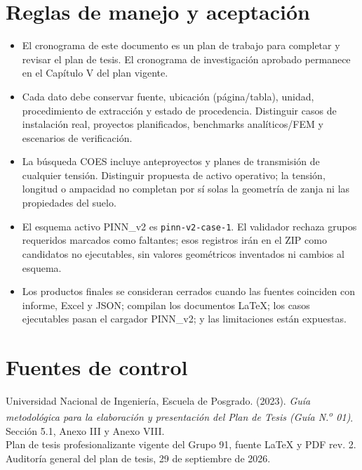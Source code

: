 \documentclass[11pt,a4paper,oneside]{report}
\begin{document}
\chapter*{Reglas de manejo y aceptaci\'on}
\begin{itemize}
  \item El cronograma de este documento es un plan de trabajo para completar y revisar el plan de tesis. El cronograma de investigaci\'on aprobado permanece en el Cap\'itulo V del plan vigente.
  \item Cada dato debe conservar fuente, ubicaci\'on (p\'agina/tabla), unidad, procedimiento de extracci\'on y estado de procedencia. Distinguir casos de instalaci\'on real, proyectos planificados, benchmarks anal\'iticos/FEM y escenarios de verificaci\'on.
  \item La b\'usqueda COES incluye anteproyectos y planes de transmisi\'on de cualquier tensi\'on. Distinguir propuesta de activo operativo; la tensi\'on, longitud o ampacidad no completan por s\'i solas la geometr\'ia de zanja ni las propiedades del suelo.
  \item El esquema activo PINN\_v2 es \texttt{pinn-v2-case-1}. El validador rechaza grupos requeridos marcados como faltantes; esos registros ir\'an en el ZIP como candidatos no ejecutables, sin valores geom\'etricos inventados ni cambios al esquema.
  \item Los productos finales se consideran cerrados cuando las fuentes coinciden con informe, Excel y JSON; compilan los documentos LaTeX; los casos ejecutables pasan el cargador PINN\_v2; y las limitaciones est\'an expuestas.
\end{itemize}

\chapter*{Fuentes de control}
Universidad Nacional de Ingenier\'ia, Escuela de Posgrado. (2023). \textit{Gu\'ia metodol\'ogica para la elaboraci\'on y presentaci\'on del Plan de Tesis (Gu\'ia N.\textsuperscript{o} 01)}. Secci\'on 5.1, Anexo III y Anexo VIII.\\
Plan de tesis profesionalizante vigente del Grupo 91, fuente LaTeX y PDF rev. 2.\\
Auditor\'ia general del plan de tesis, 29 de septiembre de 2026.
\end{document}
